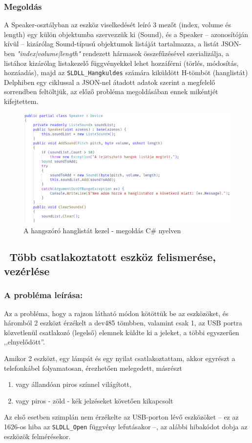 \documentclass[tocnopagenum]{thesis-ekf}
\theoremstyle{definition}
\theoremstyle{remark}
\begin{document}
	\subsubsection{Megoldás}
	A Speaker-osztályban az eszköz viselkedését leíró 3 mezőt (index, volume és length) egy külön objektumba szervezzük ki (Sound), és a Speaker -- azonosítóján kívül -- kizárólag Sound-típusú objektumok listáját tartalmazza, a listát JSON-ben \textit{"index|volume|length"} rendezett hármasok összefűzésével szerializálja, a listához kizárólag listakezelő függvényekkel lehet hozzáférni (törlés, módosítás, hozzáadás), majd az \verb*|SLDLL_Hangkuldes| számára kiküldött H-tömböt (hanglistát) Delphiben egy ciklussal a JSON-nel átadott adatok szerint a megfelelő sorrendben feltöltjük, az előző probléma megoldásában ennek mikéntjét kifejtettem.
	\begin{figure}[h!]
		\centering
		\includegraphics[scale=0.7]{speaker_csharp}
		\caption{A hangszóró hanglistát kezel - megoldás C\# nyelven}
		\label{speaker_csharp}
	\end{figure}
	\subsection{\, Több csatlakoztatott eszköz felismerése, vezérlése}
	\subsubsection{A probléma leírása:}
	Az a probléma, hogy a rajzon látható módon kötöttük be az eszközöket, és háromból 2 eszközt érzékelt a dev485 tömbben, valamint csak 1, az USB portra közvetlenül csatlakozó (legelső) elemnek küldte ki a jeleket, a többi egyszerűen ,,elnyelődött''.
	
	Amikor 2 eszközt, egy lámpát és egy nyilat csatlakoztattam, akkor egyrészt a telefonkábel folyamatosan, érezhetően melegedett, másrészt 
	\renewcommand{\labelenumi}{\alph{enumi})}
	\begin{enumerate}
		\item vagy állandóan piros színnel világított, 
		\item vagy piros - zöld - kék jelzéseket követően kikapcsolt
	\end{enumerate}
	Az első esetben szimplán nem érzékelte az USB-porton lévő eszközöket -- ez az 1626-os hiba az \verb*|SLDLL_Open| függvény lefutásakor --, az alábbi hibakódot dobja az eszközök felmérésekor.
\end{document}
